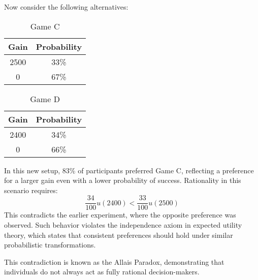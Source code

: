 \begin{example}
    Now consider the following alternatives: 
    \begin{table}[H]
        \centering
        \begin{tabular}{|c|c|}
        \hline
        \textbf{Gain} & \textbf{Probability} \\ \hline
        2500          & 33\%                  \\ \hline
        0             & 67\%                   \\ \hline
        \end{tabular}
        \caption{Game C}
    \end{table}
    \begin{table}[H]
        \centering
        \begin{tabular}{|c|c|}
        \hline
        \textbf{Gain} & \textbf{Probability} \\ \hline
        2400          & 34\%                  \\ \hline
        0             & 66\%                   \\ \hline
        \end{tabular}
        \caption{Game D}
    \end{table}
    In this new setup, 83\% of participants preferred Game C, reflecting a preference for a larger gain even with a lower probability of success.
    Rationality in this scenario requires:
    \[\frac{34}{100}u(2400)<\frac{33}{100}u(2500)\]
    This contradicts the earlier experiment, where the opposite preference was observed.
    Such behavior violates the independence axiom in expected utility theory, which states that consistent preferences should hold under similar probabilistic transformations.
    
    This contradiction is known as the Allais Paradox, demonstrating that individuals do not always act as fully rational decision-makers.
\end{example}
